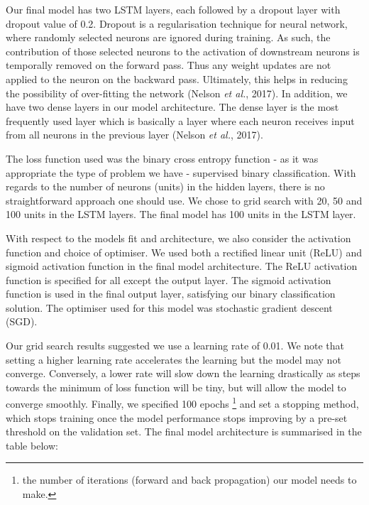 Our final model has two LSTM layers, each followed by a dropout layer with dropout value of 0.2. Dropout is a regularisation technique for neural network, where randomly selected neurons are ignored during training. As such, the contribution of those selected neurons to the activation of downstream neurons is temporally removed on the forward pass. Thus any weight updates are not applied to the neuron on the backward pass. Ultimately,  this helps in reducing the possibility of over-fitting the network (Nelson \textit{et al.}, 2017). In addition, we have two dense layers in our model architecture. The dense layer is the most frequently used layer which is basically a layer where each neuron receives input from all neurons in the previous layer (Nelson \textit{et al.}, 2017). 

The loss function used was the binary cross entropy function - as it was appropriate the type of problem we have - supervised binary classification. With regards to the number of neurons (units) in the hidden layers, there is no straightforward approach one should use. We chose to grid search with 20, 50 and 100 units in the LSTM layers. The final model has 100 units in the LSTM layer.  

With respect to the models fit and architecture, we also consider the activation function and choice of optimiser. We used both a rectified linear unit (ReLU) and sigmoid activation function in the final model architecture. The ReLU activation function is specified for all except the output layer. The sigmoid activation function is used in the final output layer, satisfying our binary classification solution. The optimiser used for this model was stochastic gradient descent (SGD). 

Our grid search results suggested we use a learning rate of 0.01. We note that setting a higher learning rate accelerates the learning but the model may not converge. Conversely, a lower rate will slow down the learning drastically as steps towards the minimum of loss function will be tiny, but will allow the model to converge smoothly.  Finally, we specified 100 epochs \footnote{the number of iterations (forward and back propagation) our model needs to make.} and set a stopping method, which stops training once the model performance stops improving by a pre-set threshold on the validation set. The final model architecture is summarised in the table below:


